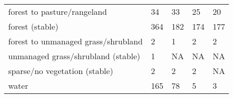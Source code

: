 \begin{table}[]
{\begin{tabular}{lllll}
forest to pasture/rangeland                    & 34          & 33               & 25        & 20              \\
forest (stable)                                & 364         & 182              & 174       & 177             \\
forest to unmanaged grass/shrubland            & 2           & 1                & 2         & 2               \\
unmanaged grass/shrubland (stable)             & 1           & NA               & NA        & NA              \\
sparse/no vegetation (stable)                  & 2           & 2                & 2         & NA              \\
water                                          & 165         & 78               & 5         & 3              
\end{tabular}%
}
\label{table:arthropods-tableS4}
\end{table}

